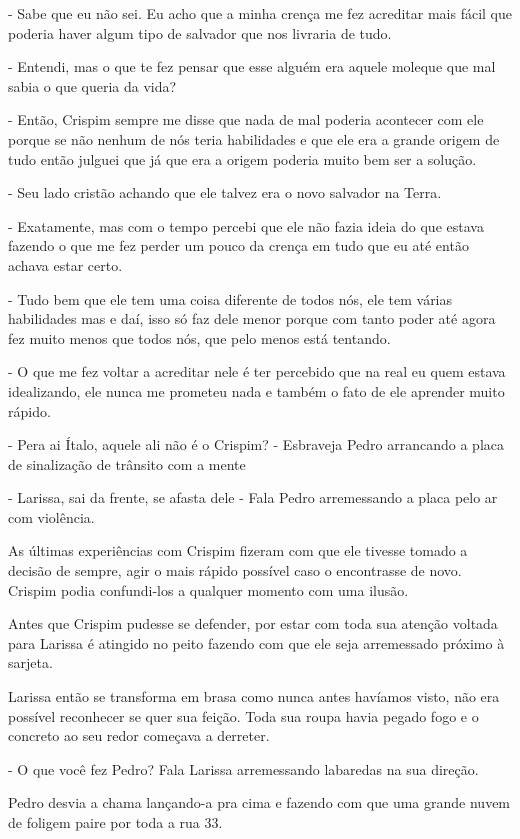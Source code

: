 - Sabe que eu não sei. Eu acho que a minha crença me fez acreditar mais fácil que poderia haver algum tipo de salvador que nos livraria de tudo.

- Entendi, mas o que te fez pensar que esse alguém era aquele moleque que mal sabia o que queria da vida?

- Então, Crispim sempre me disse que nada de mal poderia acontecer com ele porque se não nenhum de nós teria habilidades e que ele era a grande origem de tudo então julguei que já que era a origem poderia muito bem ser a solução.

- Seu lado cristão achando que ele talvez era o novo salvador na Terra.

- Exatamente, mas com o tempo percebi que ele não fazia ideia do que estava fazendo o que me fez perder um pouco da crença em tudo que eu até então achava estar certo.

- Tudo bem que ele tem uma coisa diferente de todos nós, ele tem várias habilidades mas e daí, isso só faz dele menor porque com tanto poder até agora fez muito menos que todos nós, que pelo menos está tentando.

- O que me fez voltar a acreditar nele é ter percebido que na real eu quem estava idealizando, ele nunca me prometeu nada e também o fato de ele aprender muito rápido.

- Pera ai Ítalo, aquele ali não é o Crispim? - Esbraveja Pedro arrancando a placa de sinalização de trânsito com a mente

- Larissa, sai da frente, se afasta dele - Fala Pedro arremessando a placa pelo ar com violência.

As últimas experiências com Crispim fizeram com que ele tivesse tomado a decisão de sempre, agir o mais rápido possível caso o encontrasse de novo. Crispim podia confundi-los a qualquer momento com uma ilusão.

Antes que Crispim pudesse se defender, por estar com toda sua atenção voltada para Larissa é atingido no peito fazendo com que ele seja arremessado próximo à sarjeta.

Larissa então se transforma em brasa como nunca antes havíamos visto, não era possível reconhecer se quer sua feição. Toda sua roupa havia pegado fogo e o concreto ao seu redor começava a derreter.

- O que você fez Pedro? Fala Larissa arremessando labaredas na sua direção.

Pedro desvia a chama lançando-a pra cima e fazendo com que uma grande nuvem de foligem paire por toda a rua 33.

